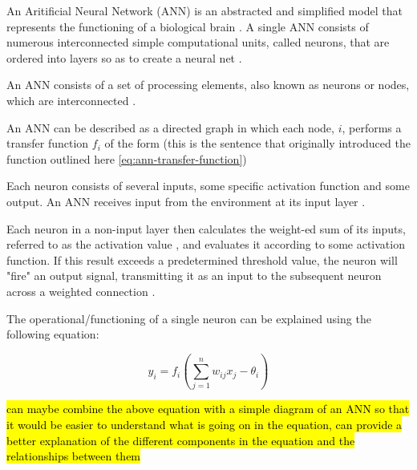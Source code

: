 An Aritificial Neural Network (ANN) is an abstracted and simplified model that represents the functioning of a biological brain \cite{mcculloch1943logical}. A single ANN consists of numerous interconnected simple computational units, called neurons, that are ordered into layers so as to create a neural net \cite{RefWorks:31}.

An ANN consists of a set of processing elements, also known as neurons or nodes, which are interconnected \cite{XinYao1999}.

An ANN can be described as a directed graph in which each node, $i$, performs a transfer function $f_i$ of the form \cite{XinYao1999} (this is the sentence that originally introduced the function outlined here \ref{eq:ann-transfer-function})


Each neuron consists of several inputs, some specific activation function and some output. An ANN receives input from the environment at its input layer \cite{RefWorks:32}.

Each neuron in a non-input layer then calculates the weight-ed sum of its inputs, referred to as the activation value \cite{yegnanarayana2009artificial,RefWorks:31}, and evaluates it according to some activation function. If this result exceeds a predetermined threshold value, the neuron will "fire" an output signal, transmitting it as an input to the subsequent neuron across a weighted connection \cite{yegnanarayana2009artificial}.


The operational/functioning of a single neuron can be explained using the following equation:

\begin{equation} \label{eq:ann-transfer-function}
	y_i = f_i(\sum_{j=1}^{n} w_{ij} x_j - \theta_i)
\end{equation}

\hl{can maybe combine the above equation with a simple diagram of an ANN so that it would be easier to understand what is going on in the equation, can provide a better explanation of the different components in the equation and the relationships between them}

